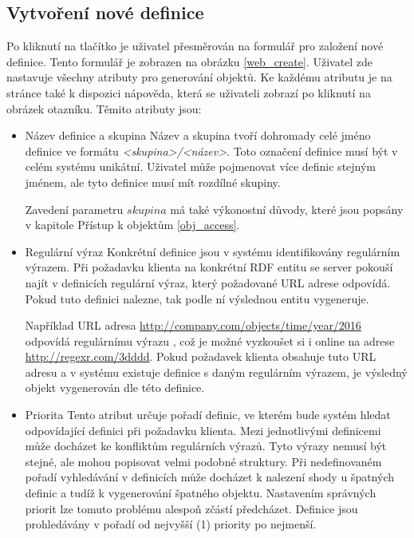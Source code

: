 \documentclass[thesis=B,czech]{FITthesis}[2012/06/26]
\begin{document}
    \subsection{Vytvoření nové definice}\label{def_create}
    Po kliknutí na tlačítko  je uživatel přesměrován na formulář pro založení nové definice. Tento formulář je zobrazen na obrázku
    \ref{web_create}.
    Uživatel zde nastavuje všechny atributy pro generování objektů.
    Ke každému atributu je na stránce také k dispozici nápověda, která se uživateli zobrazí po kliknutí na obrázek otazníku.
    Těmito atributy jsou:
    \begin{itemize}
     \item Název definice a skupina
      \subitem Název a skupina tvoří dohromady celé jméno definice ve formátu \textit{<skupina>/<název>}. Toto označení definice musí být v celém systému 
      unikátní. Uživatel může pojmenovat více definic stejným jménem, ale tyto definice musí mít rozdílné skupiny.
      
      Zavedení parametru $skupina$ má také výkonostní důvody, které jsou popsány v kapitole Přístup k objektům \ref{obj_access}.
      
      \item Regulární výraz
	\subitem Konkrétní definice jsou v systému identifikovány regulárním výrazem. Při požadavku klienta na konkrétní RDF entitu se server pokouší najít v 
	definicích regulární výraz, který požadované URL adrese odpovídá. Pokud tuto definici nalezne, tak podle ní výslednou entitu vygeneruje.
	
	Například URL adresa \url{http://company.com/objects/time/year/2016} odpovídá regulárnímu výrazu
	, což
	je možné vyzkoušet si i online na adrese \url{http://regexr.com/3dddd}.
	Pokud požadavek klienta obsahuje tuto URL adresu a v systému existuje definice s daným regulárním výrazem, je výsledný objekt vygenerován
	dle této definice.
	
	
      \item Priorita
	\subitem Tento atribut určuje pořadí definic, ve kterém bude systém hledat odpovídající definici při požadavku klienta. 
	Mezi jednotlivými definicemi může docházet ke konfliktům regulárních výrazů. Tyto výrazy nemusí být stejné, ale mohou popisovat velmi podobné struktury.
	Při nedefinovaném pořadí vyhledávání v definicích může docházet k nalezení shody u špatných definic a tudíž k vygenerování špatného objektu.
	Nastavením správných priorit lze tomuto problému alespoň zčástí předcházet. Definice jsou prohledávány v pořadí od nejvyšší (1) priority po nejmenší.
	

\end{itemize}
\end{document}
